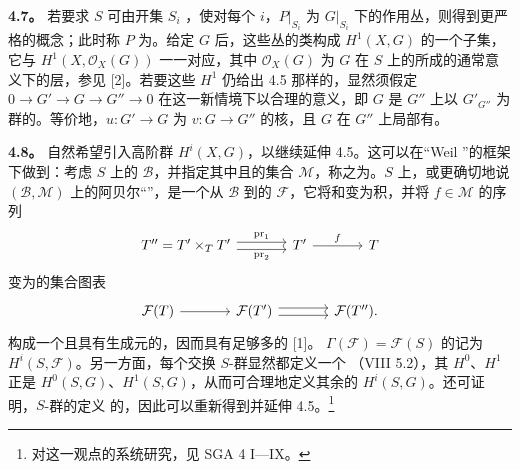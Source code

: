 \textbf{4.7。} 若要求 $S$ 可由开集 $S_i$ ，使对每个 $i$，$P|_{S_i}$ 为 $G|_{S_i}$ 下的作用丛，则得到更严格的概念；此时称 $P$ 为。给定 $G$ 后，这些丛的类构成 $H^1(X,G)$ 的一个子集，它与 $H^1(X,\mathscr O_X(G))$ 一一对应，其中 $\mathscr O_X(G)$ 为 $G$ 在 $S$ 上的所成的通常意义下的层，参见 [2]。若要这些 $H^1$ 仍给出 4.5 那样的，显然须假定 $0\to G'\to G\to G''\to0$ 在这一新情境下以合理的意义，即 $G$ 是 $G''$ 上以 $G'_{G''}$ 为群的。等价地，$u:G'\to G$ 为 $v:G\to G''$ 的核，且 $G$ 在 $G''$ 上局部有。

\textbf{4.8。} 自然希望引入高阶群 $H^i(X,G)$，以继续延伸 4.5。这可以在“Weil ”的框架下做到：考虑 $S$ 上的 $\mathcal B$，并指定其中且的集合 $\mathcal M$，称之为。$S$ 上，或更确切地说 $(\mathcal B,\mathcal M)$ 上的阿贝尔“”，是一个从 $\mathcal B$ 到的 $\mathcal F$，它将和变为积，并将 $f\in\mathcal M$ 的序列
\[
\begin{tikzcd}[column sep=large]
T''=T'\times_TT'\arrow[r,shift left=.6ex,"\operatorname{pr}_1"]\arrow[r,shift right=.6ex,"\operatorname{pr}_2"']&T'\arrow[r,"f"]&T
\end{tikzcd}
\]
变为的集合图表
\[
\begin{tikzcd}[column sep=large]
\mathcal F(T)\arrow[r]&\mathcal F(T')\arrow[r,shift left=.6ex]\arrow[r,shift right=.6ex]&\mathcal F(T'').
\end{tikzcd}
\]
构成一个且具有生成元的，因而具有足够多的 [1]。 $\Gamma(\mathcal F)=\mathcal F(S)$ 的记为 $H^i(S,\mathcal F)$。另一方面，每个交换 $S$-群显然都定义一个 （VIII 5.2），其 $H^0$、$H^1$ 正是 $H^0(S,G)$、$H^1(S,G)$，从而可合理地定义其余的 $H^i(S,G)$。还可证明，$S$-群的定义 的，因此可以重新得到并延伸 4.5。\footnote{对这一观点的系统研究，见 SGA 4 I—IX。}

